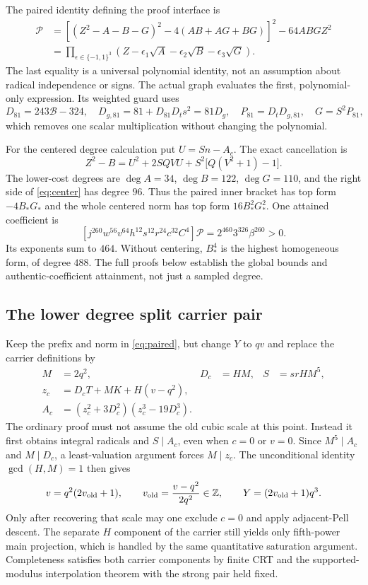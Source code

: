 The paired identity defining the proof interface is
\begin{align*}
 \mathcal P
 &=\left[(Z^2-A-B-G)^2-4(AB+AG+BG)\right]^2-64ABGZ^2\\
 &=\prod_{\epsilon\in\{-1,1\}^3}
   (Z-\epsilon_1\sqrt A-\epsilon_2\sqrt B-\epsilon_3\sqrt G).
\end{align*}
The last equality is a universal polynomial identity, not an assumption about radical independence or signs. The actual graph evaluates the first, polynomial-only expression. Its weighted guard uses
\[
 D_{81}=243\mathcal B-324,\quad
 D_{g,81}=81+D_{81}D_ts^2=81D_g,\quad
 P_{81}=D_tD_{g,81},\quad G=S^2P_{81},
\]
which removes one scalar multiplication without changing the polynomial.

For the centered degree calculation put $U=Sn-A_c$. The exact cancellation is
\begin{equation}\label{eq:center}
 Z^2-B=U^2+2SQVU+S^2\bigl[Q(V^2+1)-1\bigr].
\end{equation}
The lower-cost degrees are $\deg A=34$, $\deg B=122$, $\deg G=110$, and the right side of \eqref{eq:center} has degree $96$. Thus the paired inner bracket has top form $-4B_*G_*$ and the whole centered norm has top form $16B_*^2G_*^2$. One attained coefficient is
\[
 [j^{260}w^{56}v^{64}h^{12}s^{12}r^{24}c^{32}C^4]\mathcal P
 =2^{460}3^{326}\beta^{260}>0.
\]
Its exponents sum to $464$. Without centering, $B_*^4$ is the highest homogeneous form, of degree $488$. The full proofs below establish the global bounds and authentic-coefficient attainment, not just a sampled degree.

\subsection{The lower degree split carrier pair}
Keep the prefix and norm in \eqref{eq:paired}, but change $Y$ to $qv$ and replace the carrier definitions by
\begin{align*}
 M&=2q^2,& D_c&=HM,& S&=srHM^5,\\
 z_c&=D_cT+MK+H(v-q^2),&&&\\
 A_c&=(z_c^2+3D_c^2)(z_c^3-19D_c^3).&&&
\end{align*}
The ordinary proof must not assume the old cubic scale at this point. Instead it first obtains integral radicals and $S\mid A_c$, even when $c=0$ or $v=0$. Since $M^5\mid A_c$ and $M\mid D_c$, a least-valuation argument forces $M\mid z_c$. The unconditional identity $\gcd(H,M)=1$ then gives
\[
 v=q^2(2v_{\rm old}+1),\qquad
 v_{\rm old}=\frac{v-q^2}{2q^2}\in\mathbb Z,
 \qquad Y=(2v_{\rm old}+1)q^3.
\]
Only after recovering that scale may one exclude $c=0$ and apply adjacent-Pell descent. The separate $H$ component of the carrier still yields only fifth-power main projection, which is handled by the same quantitative saturation argument. Completeness satisfies both carrier components by finite CRT and the supported-modulus interpolation theorem with the strong pair held fixed.

